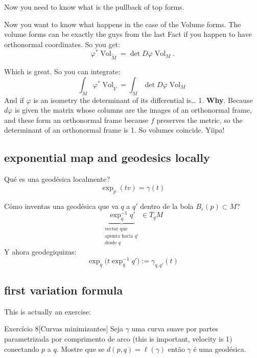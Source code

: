 Now you need to know what is the pullback of top forms. 

Now you want to know what happens in the case of the Volume forms. The volume forms can be exactly the guys from the last Fact if you happen to have orthonormal coordinates. So you get:
\[\varphi^*\operatorname{Vol}_{\widetilde{M}}=\det D\varphi \operatorname{Vol}_M.\]

Which is great. So you can integrate:
\[\int_M \varphi^*\operatorname{Vol}_{\widetilde{V}}=\int_M \det D\varphi \operatorname{Vol}_M\]
And if \(\varphi\) is an isometry the determinant of its differential is… 1. \textbf{Why}. Because \(d \varphi\) is given the matrix whose columns are the images of an orthonormal frame, and these form an orthonormal frame because \(f\) preserves the metric, so the determinant of an orthonormal frame is 1.  So volumes coincide. Yiipa!


\subsection{exponential map and geodesics locally}

Qué es una geodésica localmente?
\[\operatorname{exp}_p(tv)=\gamma(t)\]

Cómo inventas una geodésica que va \(q\) a \(q'\) dentro de la bola \(B_\varepsilon(p)\subset M\)?
\[\underbrace{\operatorname{exp}_q^{-1}q'}_{\substack{\text{vector que}  \\\text{apunta hacia \(q'\)}\\\text{desde \(q\)}   }} \in T_q M\]
Y ahora geodegiquizas:
\[\operatorname{exp}_q\Big(t\operatorname{exp}_q^{-1}q'\Big):=\gamma_{q,q'}(t)\]

\subsection{first variation formula}

This is actually an exercise:

\begin{thing4}{Exercício 8}[Curvas minimizantes]\label{exer:8}\leavevmode
Seja \(\gamma\) uma curva suave por partes parametrizada por comprimento de arco (this is important, velocity is 1) conectando \(p\) a \(q\). Mostre que se \(d(p,q)=\ell(\gamma)\) então \(\gamma\) é uma geodésica.
\end{thing4}

